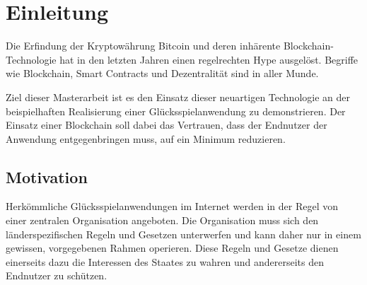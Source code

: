 
\chapter{Einleitung} %

\label{Chapter1} %


\newcommand{\keyword}[1]{\textbf{#1}}
\newcommand{\tabhead}[1]{\textbf{#1}}
\newcommand{\code}[1]{\texttt{#1}}
\newcommand{\file}[1]{\texttt{\bfseries#1}}
\newcommand{\option}[1]{\texttt{\itshape#1}}

Die Erfindung der Kryptowährung Bitcoin und deren inhärente Blockchain-Technologie hat in den letzten Jahren einen regelrechten Hype ausgelöst. Begriffe wie Blockchain, Smart Contracts und Dezentralität sind in aller Munde. 

Ziel dieser Masterarbeit ist es den Einsatz dieser neuartigen Technologie an der beispielhaften Realisierung einer Glücksspielanwendung zu demonstrieren. Der Einsatz einer Blockchain soll dabei das Vertrauen, dass der Endnutzer der Anwendung entgegenbringen muss, auf ein Minimum reduzieren. 

\section{Motivation}


Herkömmliche Glücksspielanwendungen im Internet werden in der Regel von einer zentralen Organisation angeboten. Die Organisation muss sich den länderspezifischen Regeln und Gesetzen unterwerfen und kann daher nur in einem gewissen, vorgegebenen Rahmen operieren. Diese Regeln und Gesetze dienen einerseits dazu die Interessen des Staates zu wahren und andererseits den Endnutzer zu schützen. 

